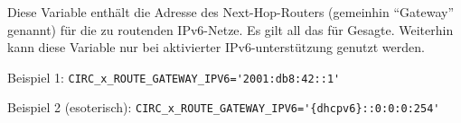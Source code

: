 \begin{description}

Diese Variable enthält die Adresse des Next-Hop-Rou\-ters (gemeinhin ``Gateway''
genannt) für die zu routenden IPv6-Netze. Es gilt all das für
 Gesagte. Weiterhin kann diese Variable nur
bei aktivierter IPv6-unterstützung genutzt werden.

Beispiel 1: \verb+CIRC_x_ROUTE_GATEWAY_IPV6='2001:db8:42::1'+

Beispiel 2 (esoterisch): \verb+CIRC_x_ROUTE_GATEWAY_IPV6='{dhcpv6}::0:0:0:254'+

\end{description}
